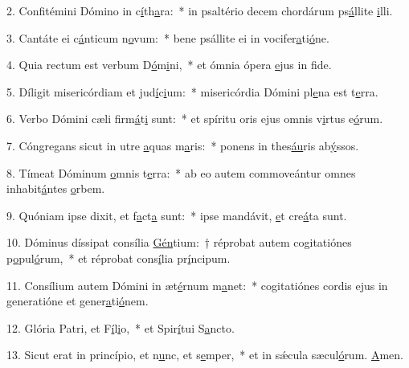 2. Confitémini Dómino in c\uline{í}th\uline{a}ra:~* in psaltério decem chordárum ps\uline{á}llite \uline{i}lli.\par 
3. Cantáte ei c\uline{á}nticum n\uline{o}vum:~* bene psállite ei in vocifer\uline{a}ti\uline{ó}ne.\par 
4. Quia rectum est verbum D\uline{ó}m\uline{i}ni,~* et ómnia ópera \uline{e}jus in f\uline{i}de.\par 
5. Díligit misericórdiam et jud\uline{í}c\uline{i}um:~* misericórdia Dómini pl\uline{e}na est t\uline{e}rra.\par 
6. Verbo Dómini cæli firm\uline{á}t\uline{i} sunt:~* et spíritu oris ejus omnis v\uline{i}rtus e\uline{ó}rum.\par 
7. Cóngregans sicut in utre \uline{a}quas m\uline{a}ris:~* ponens in thes\uline{áu}ris ab\uline{ý}ssos.\par 
8. Tímeat Dóminum \uline{o}mnis t\uline{e}rra:~* ab eo autem commoveántur omnes inhabit\uline{á}ntes \uline{o}rbem.\par 
9. Quóniam ipse dixit, et f\uline{a}ct\uline{a} sunt:~* ipse mandávit, \uline{e}t cre\uline{á}ta sunt.\par 
10. Dóminus díssipat consília \uline{Gén}tium:~† réprobat autem cogitatiónes p\uline{o}pul\uline{ó}rum,~* et réprobat cons\uline{í}lia pr\uline{í}ncipum.\par 
11. Consílium autem Dómini in æt\uline{é}rnum m\uline{a}net:~* cogitatiónes cordis ejus in generatióne et gener\uline{a}ti\uline{ó}nem.\par 
12. Glória Patri, et F\uline{í}l\uline{i}o,~* et Spir\uline{í}tui S\uline{a}ncto.\par 
13. Sicut erat in princípio, et n\uline{u}nc, et s\uline{e}mper,~* et in sǽcula sæcul\uline{ó}rum. \uline{A}men.\par 
